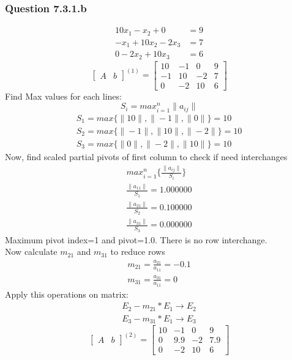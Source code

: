 \documentclass{article}
\begin{document}
\subsubsection{Question 7.3.1.b}
\begin{align}
\label{q7.3.1.b.1}10x_{1}-x_{2}+0&=9 \\
\label{q7.3.1.b.2}-x_{1}+10x_{2}-2x_{3}&=7 \\
\label{q7.3.1.b.3}0-2x_{2}+10x_{3}&=6
\end{align}
\[
\left[
\begin{array}{c|c}
A&b
\end{array}
\right]^{(1)}
=
\left[
\begin{array}{ccc|c}
	10&-1&0&9\\
	-1&10&-2&7\\
	0&-2&10&6 
\end{array}
\right]
\]
Find Max values for each lines: 
\begin{equation}
\label{findSMax3}S_{i}=max_{i=1}^n\|a_{ij}\|
\end{equation}
\begin{align}
	S_{1}=max\{\|10\|,\|-1\|,\|0\|\}=10\\
	S_{2}=max\{\|-1\|,\|10\|,\|-2\|\}=10\\
	S_{3}=max\{\|0\|,\|-2\|,\|10\|\}=10
\end{align}
Now, find scaled partial pivots of first column to check if need interchanges
\begin{align}
	max_{i=1}^n\{\frac{\|a_{ij}\|}{S_{i}}\}\\
	\frac{\|a_{11}\|}{S_{1}}=1.000000\\
	\frac{\|a_{21}\|}{S_{2}}=0.100000\\
	\frac{\|a_{31}\|}{S_{3}}=0.000000
\end{align}
Maximum pivot index=1 and pivot=1.0. There is no row interchange.\\
Now calculate $m_{21}$ and $m_{31}$ to reduce rows 
\begin{align}
	m_{21}=\frac{a_{21}}{a_{11}}=-0.1\\
	m_{31}=\frac{a_{31}}{a_{11}}=0
\end{align}
Apply this operations on matrix:
\begin{align}
	E_{2}-m_{21}*E_{1}\rightarrow E_{2}\\
	E_{3}-m_{31}*E_{1}\rightarrow E_{3}
\end{align}
\[
\left[
\begin{array}{c|c}
A&b
\end{array}
\right]^{(2)}
=
\left[
\begin{array}{ccc|c}
	10&-1&0&9\\
	0&9.9&-2&7.9\\
	0&-2&10&6 
\end{array}
\right]
\]
\end{document}
